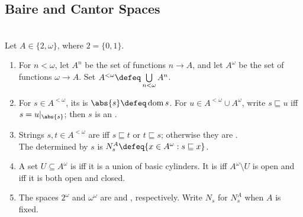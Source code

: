 \subsection{Baire and Cantor Spaces}

\begin{definition} \label{def:baire-cantor-sequences-and-cylinders} \\
Let $A\in\{2,\omega\}$, where $2=\{0,1\}$.
\begin{enumerate}[label=(\roman*)]
\setlength{\itemsep}{0pt}
\item For $n<\omega$, let $A^n$ be the set of functions $n\to A$, and let $A^\omega$ be the set of functions $\omega\to A$. Set $A^{<\omega}\defeq\bigcup\limits_{n<\omega}A^n$.
\item For $s\in A^{<\omega}$, its  is $\abs{s}\defeq\operatorname{dom}s$. For $u\in A^{<\omega}\cup A^\omega$, write $s\sqsubseteq u$ iff $s=u|_{\abs{s}}$; then $s$ is an .
\item Strings $s,t\in A^{<\omega}$ are  iff $s\sqsubseteq t$ or $t\sqsubseteq s$; otherwise they are .\\
The  determined by $s$ is $N_s^A\defeq\{x\in A^\omega:s\sqsubseteq x\}$.
\item A set $U\subseteq A^\omega$ is  iff it is a union of basic cylinders. It is  iff $A^\omega\setminus U$ is open and  iff it is both open and closed.
\item The spaces $2^\omega$ and $\omega^\omega$ are  and , respectively. Write $N_s$ for $N_s^A$ when $A$ is fixed.
\end{enumerate}
\end{definition}

